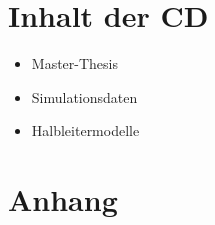 \chapter{Inhalt der CD}
\begin{itemize}
	\item Master-Thesis
	\item Simulationsdaten
	\item Halbleitermodelle

\end{itemize}

\chapter{Anhang}
\setcounter{figure}{0}
\renewcommand{\thefigure}{A\arabic{figure}}

\setcounter{table}{0}
\renewcommand{\thetable}{A\arabic{table}}




